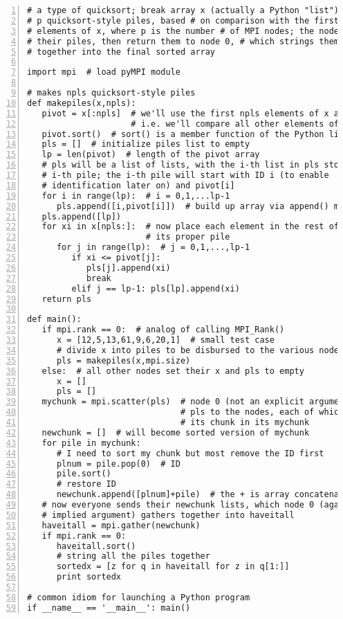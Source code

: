 \begin{Verbatim}[fontsize=\relsize{-2},numbers=left]
# a type of quicksort; break array x (actually a Python "list") into 
# p quicksort-style piles, based # on comparison with the first p-1 
# elements of x, where p is the number # of MPI nodes; the nodes sort 
# their piles, then return them to node 0, # which strings them all 
# together into the final sorted array 

import mpi  # load pyMPI module

# makes npls quicksort-style piles
def makepiles(x,npls):
   pivot = x[:npls]  # we'll use the first npls elements of x as pivots,
                     # i.e. we'll compare all other elements of x to these
   pivot.sort()  # sort() is a member function of the Python list class
   pls = []  # initialize piles list to empty
   lp = len(pivot)  # length of the pivot array
   # pls will be a list of lists, with the i-th list in pls storing the
   # i-th pile; the i-th pile will start with ID i (to enable 
   # identification later on) and pivot[i]
   for i in range(lp):  # i = 0,1,...lp-1
      pls.append([i,pivot[i]])  # build up array via append() member function
   pls.append([lp])
   for xi in x[npls:]:  # now place each element in the rest of x into
                        # its proper pile
      for j in range(lp):  # j = 0,1,...,lp-1
         if xi <= pivot[j]:
            pls[j].append(xi)
            break
         elif j == lp-1: pls[lp].append(xi)
   return pls

def main():
   if mpi.rank == 0:  # analog of calling MPI_Rank()
      x = [12,5,13,61,9,6,20,1]  # small test case
      # divide x into piles to be disbursed to the various nodes
      pls = makepiles(x,mpi.size)
   else:  # all other nodes set their x and pls to empty
      x = []
      pls = []
   mychunk = mpi.scatter(pls)  # node 0 (not an explicit argument) disburses 
                               # pls to the nodes, each of which receives 
                               # its chunk in its mychunk
   newchunk = []  # will become sorted version of mychunk
   for pile in mychunk:
      # I need to sort my chunk but most remove the ID first
      plnum = pile.pop(0)  # ID
      pile.sort()
      # restore ID
      newchunk.append([plnum]+pile)  # the + is array concatenation
   # now everyone sends their newchunk lists, which node 0 (again an
   # implied argument) gathers together into haveitall
   haveitall = mpi.gather(newchunk)
   if mpi.rank == 0:
      haveitall.sort()
      # string all the piles together
      sortedx = [z for q in haveitall for z in q[1:]]
      print sortedx  

# common idiom for launching a Python program
if __name__ == '__main__': main()
\end{Verbatim}

